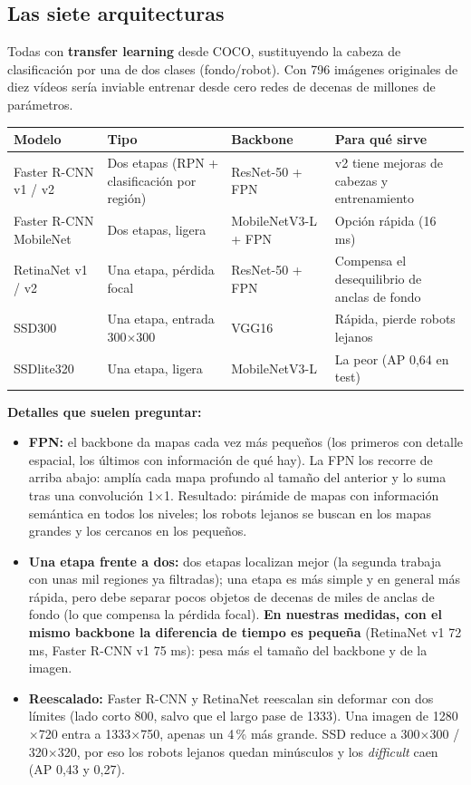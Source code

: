 \documentclass[11pt,a4paper]{article}
\begin{document}
\subsection{Las siete arquitecturas}
Todas con \textbf{transfer learning} desde COCO, sustituyendo la cabeza de clasificación por una de dos clases (fondo/robot). Con 796 imágenes originales de diez vídeos sería inviable entrenar desde cero redes de decenas de millones de parámetros.

\begin{center}
\small
\begin{tabular}{@{}P{3.6cm}P{4.6cm}P{3.2cm}P{3.6cm}@{}}
\toprule
\textbf{Modelo} & \textbf{Tipo} & \textbf{Backbone} & \textbf{Para qué sirve} \\
\midrule
Faster R-CNN v1 / v2 & Dos etapas (RPN + clasificación por región) & ResNet-50 + FPN & v2 tiene mejoras de cabezas y entrenamiento \\
Faster R-CNN MobileNet & Dos etapas, ligera & MobileNetV3-L + FPN & Opción rápida (16 ms) \\
RetinaNet v1 / v2 & Una etapa, pérdida focal & ResNet-50 + FPN & Compensa el desequilibrio de anclas de fondo \\
SSD300 & Una etapa, entrada 300$\times$300 & VGG16 & Rápida, pierde robots lejanos \\
SSDlite320 & Una etapa, ligera & MobileNetV3-L & La peor (AP 0,64 en test) \\
\bottomrule
\end{tabular}
\end{center}

\textbf{Detalles que suelen preguntar:}
\begin{itemize}
  \item \textbf{FPN:} el backbone da mapas cada vez más pequeños (los primeros con detalle espacial, los últimos con información de qué hay). La FPN los recorre de arriba abajo: amplía cada mapa profundo al tamaño del anterior y lo suma tras una convolución 1$\times$1. Resultado: pirámide de mapas con información semántica en todos los niveles; los robots lejanos se buscan en los mapas grandes y los cercanos en los pequeños.
  \item \textbf{Una etapa frente a dos:} dos etapas localizan mejor (la segunda trabaja con unas mil regiones ya filtradas); una etapa es más simple y en general más rápida, pero debe separar pocos objetos de decenas de miles de anclas de fondo (lo que compensa la pérdida focal). \textbf{En nuestras medidas, con el mismo backbone la diferencia de tiempo es pequeña} (RetinaNet v1 72 ms, Faster R-CNN v1 75 ms): pesa más el tamaño del backbone y de la imagen.
  \item \textbf{Reescalado:} Faster R-CNN y RetinaNet reescalan sin deformar con dos límites (lado corto 800, salvo que el largo pase de 1333). Una imagen de 1280$\times$720 entra a 1333$\times$750, apenas un 4\,\% más grande. SSD reduce a 300$\times$300 / 320$\times$320, por eso los robots lejanos quedan minúsculos y los \emph{difficult} caen (AP 0,43 y 0,27).
\end{itemize}
\end{document}
